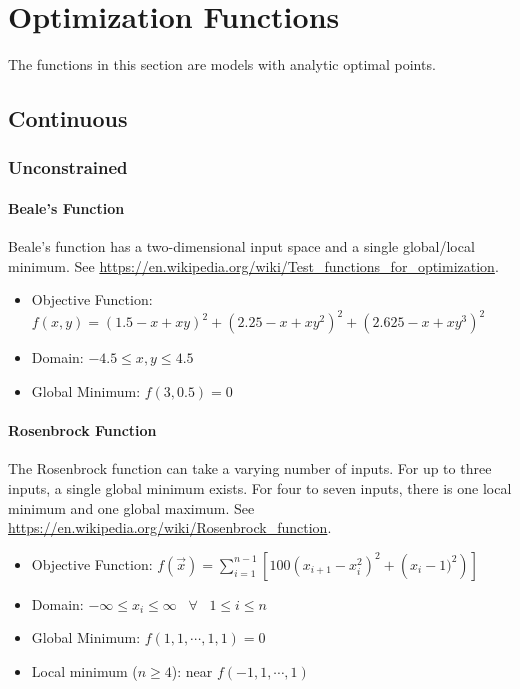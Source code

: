 \section{Optimization Functions}

The functions in this section are models with analytic optimal points.
\setcounter{tocdepth}{4}
\subsection{Continuous}
\subsubsection{Unconstrained}
\paragraph{Beale's Function}
Beale's function has a two-dimensional input space and a single global/local minimum.
See \url{https://en.wikipedia.org/wiki/Test_functions_for_optimization}.

\begin{itemize}
  \item Objective Function: $f(x,y) = (1.5-x+xy)^2+(2.25-x+xy^2)^2+(2.625-x+xy^3)^2$
  \item Domain: $-4.5 \leq x,y \leq 4.5$
  \item Global Minimum: $f(3,0.5)=0$
\end{itemize}


\paragraph{Rosenbrock Function}
The Rosenbrock function can take a varying number of inputs.  For up to three inputs, a single global minimum
exists.  For four to seven inputs, there is one local minimum and one global maximum.
See \url{https://en.wikipedia.org/wiki/Rosenbrock_function}.

\begin{itemize}
  \item Objective Function: $f(\vec x) = \sum_{i=1}^{n-1}\left[100\left(x_{i+1}-x_i^2\right)^2+\left(x_i-1)^2\right) \right]$
  \item Domain: $ -\infty \leq x_i \leq \infty \hspace{10pt} \forall \hspace{10pt} 1\leq i \leq n$
  \item Global Minimum: $f(1,1,\cdots,1,1)=0$
  \item Local minimum ($n\geq4$): near $f(-1,1,\cdots,1)$
\end{itemize}


